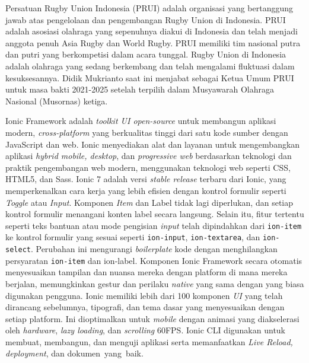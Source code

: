 \documentclass[a4paper,twoside]{article}
\begin{document}

Persatuan Rugby Union Indonesia (PRUI) adalah organisasi yang bertanggung jawab atas pengelolaan dan pengembangan Rugby Union di Indonesia. PRUI adalah asosiasi olahraga yang sepenuhnya diakui di Indonesia dan telah menjadi anggota penuh Asia Rugby dan World Rugby. PRUI memiliki tim nasional putra dan putri yang berkompetisi dalam acara tunggal. Rugby Union di Indonesia adalah olahraga yang sedang berkembang dan telah mengalami fluktuasi dalam kesuksesannya. Didik Mukrianto saat ini menjabat sebagai Ketua Umum PRUI untuk masa bakti 2021-2025 setelah terpilih dalam Musyawarah Olahraga Nasional (Musornas) ketiga.

Ionic Framework adalah \textit{toolkit UI open-source} untuk membangun aplikasi modern, \textit{cross-platform} yang berkualitas tinggi dari satu kode sumber dengan JavaScript dan web. Ionic menyediakan alat dan layanan untuk mengembangkan aplikasi \textit{hybrid mobile, desktop}, dan \textit{progressive web} berdasarkan teknologi dan praktik pengembangan web modern, menggunakan teknologi web seperti CSS, HTML5, dan Sass. Ionic 7 adalah versi \textit{stable release} terbaru dari Ionic, yang memperkenalkan cara kerja yang lebih efisien dengan kontrol formulir seperti \textit{Toggle} atau \textit{Input}. Komponen \textit{Item} dan Label tidak lagi diperlukan, dan setiap kontrol formulir menangani konten label secara langsung. Selain itu, fitur tertentu seperti teks bantuan atau mode pengisian \textit{input} telah dipindahkan dari \texttt{ion-item} ke kontrol formulir yang sesuai seperti \texttt{ion-input}, \texttt{ion-textarea}, dan \texttt{ion-select}. Perubahan ini mengurangi \textit{boilerplate} kode dengan menghilangkan persyaratan \texttt{ion-item} dan ion-label. Komponen Ionic Framework secara otomatis menyesuaikan tampilan dan nuansa mereka dengan platform di mana mereka berjalan, memungkinkan gestur dan perilaku \textit{native} yang sama dengan yang biasa digunakan pengguna. Ionic memiliki lebih dari 100 komponen \textit{UI} yang telah dirancang sebelumnya, tipografi, dan tema dasar yang menyesuaikan dengan setiap platform. Ini dioptimalkan untuk \textit{mobile} dengan animasi yang diakselerasi oleh \textit{hardware}, \textit{lazy loading}, dan \textit{scrolling} 60FPS. Ionic CLI digunakan untuk membuat, membangun, dan menguji aplikasi serta memanfaatkan \textit{Live Reload, deployment}, dan dokumen~yang~baik.
\end{document}
